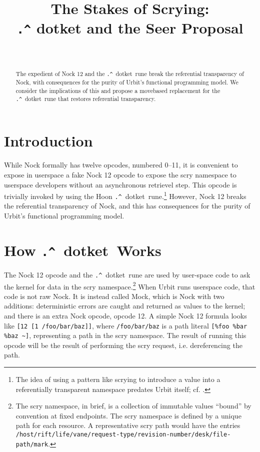 \documentclass[twoside]{article}
\title{The Stakes of Scrying:  \\ \lstinline[style=inlinecode]{.^} dotket and the Seer Proposal}
\author{\authorname~\authorpatp \\ \affiliation}
\date{}
\newcommand{\dotket}{\lstinline[style=inlinecode]{.^}~dotket}
\begin{document}
\maketitle
\thispagestyle{firststyle}

\begin{abstract}
\noindent
The expedient of Nock 12 and the \dotket~rune break the referential transparency of Nock, with consequences for the purity of Urbit's functional programming model.  We consider the implications of this and propose a move\-based replacement for the \dotket~rune that restores referential transparency.
\end{abstract}

\setcounter{page}{35}

\tableofcontents

\section{Introduction}

While Nock formally has twelve opcodes, numbered 0--11, it is convenient to expose in userspace a fake Nock 12 opcode to expose the scry namespace to userspace developers without an asynchronous retrievel step.  This opcode is trivially invoked by using the Hoon \dotket~rune.\footnote{The idea of using a pattern like scrying to introduce a value into a referentially transparent namespace predates Urbit itself; cf. \citet{Yarvin2006}.}  However, Nock 12 breaks the referential transparency of Nock, and this has consequences for the purity of Urbit's functional programming model.

\section{How \dotket~Works}

The Nock 12 opcode and the \dotket~rune are used by user-\newline{}space code to ask the kernel for data in the scry namespace.\footnote{The scry namespace, in brief, is a collection of immutable values “bound” by convention at fixed endpoints.  The scry namespace is defined by a unique path for each resource.  A representative scry path would have the entries \texttt{/host/rift/life/vane/request-type/revision-number/desk\newline{}/file-path/mark}.}  When Urbit runs userspace code, that code is not raw Nock.  It is instead called Mock, which is Nock with two additions:   deterministic errors are caught and returned as values to the kernel; and there is an extra Nock opcode, opcode 12.  A simple Nock 12 formula looks like \lstinline[style=inlinecode]{[12 [1 /foo/bar/baz]]}, where \lstinline[style=inlinecode]{/foo/bar/baz} is a path literal \lstinline[style=inlinecode]{[%foo %bar %baz ~]}, representing a path in the scry namespace.  The result of running this opcode will be the result of performing the scry request, i.e. dereferencing the path.
\end{document}
